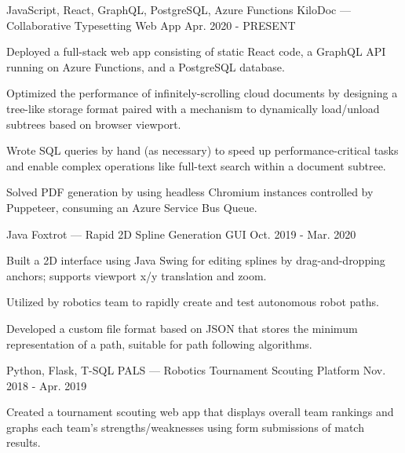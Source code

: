
\begin{cventries}
  \cventry
  {JavaScript, React, GraphQL, PostgreSQL, Azure Functions} %
  {KiloDoc --- Collaborative Typesetting Web App} %
  {} %
  {Apr. 2020 - PRESENT} %
  {
    \begin{cvitems} %
      \item {Deployed a full-stack web app consisting of static React code, a GraphQL API running on Azure Functions, and a PostgreSQL database.}
      \item {Optimized the performance of infinitely-scrolling cloud documents by designing a tree-like storage format paired with a mechanism to dynamically load/unload subtrees based on browser viewport.}
      \item {Wrote SQL queries by hand (as necessary) to speed up performance-critical tasks and enable complex operations like full-text search within a document subtree.}
      \item {Solved PDF generation by using headless Chromium instances controlled by Puppeteer, consuming an Azure Service Bus Queue.}
    \end{cvitems}
  }

  \cventry
  {Java} %
  {Foxtrot --- Rapid 2D Spline Generation GUI} %
  {} %
  {Oct. 2019 - Mar. 2020} %
  {
    \begin{cvitems} %
      \item {Built a 2D interface using Java Swing for editing splines by drag-and-dropping anchors; supports viewport x/y translation and zoom.}
      \item {Utilized by robotics team to rapidly create and test autonomous robot paths.}
      \item {Developed a custom file format based on JSON that stores the minimum representation of a path, suitable for path following algorithms.}
    \end{cvitems}
  }

  \cventry
  {Python, Flask, T-SQL} %
  {PALS --- Robotics Tournament Scouting Platform} %
  {} %
  {Nov. 2018 - Apr. 2019} %
  {
    \begin{cvitems} %
      \item {Created a tournament scouting web app that displays overall team rankings and graphs each team's strengths/weaknesses using form submissions of match results.}
    \end{cvitems}
  }
\end{cventries}
